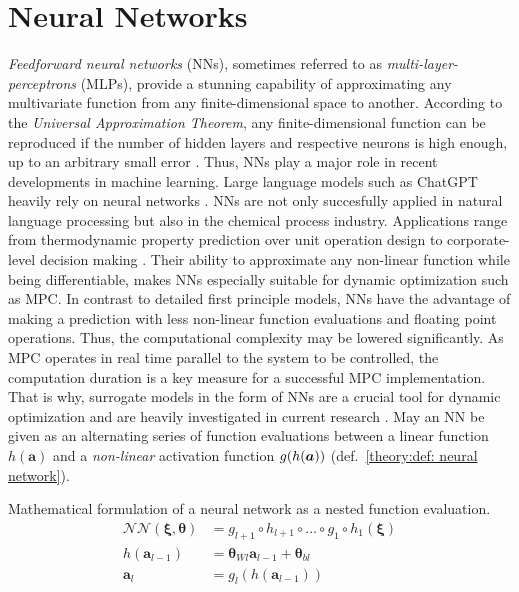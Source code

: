 \section{Neural Networks}
 
\emph{Feedforward neural networks} (NNs), sometimes referred to as \emph{multi-layer-perceptrons} (MLPs),
provide a stunning capability of approximating any multivariate function from any finite-dimensional
space to another. According to the \emph{Universal Approximation Theorem}, any finite-dimensional function can be reproduced if the number of hidden
layers and respective neurons is high enough, up to an arbitrary small error \cite{hornik1990}. Thus, NNs play a major role in
recent developments in machine learning. Large language models such as ChatGPT heavily rely on neural
networks \cite{vaswani2023}. NNs are not only succesfully applied in natural language processing but also in the chemical process industry.
Applications range from thermodynamic property prediction over unit operation design to corporate-level decision making \cite{mcbride2019}.
Their ability to approximate any non-linear function while being differentiable, makes NNs especially suitable for dynamic optimization
such as MPC. In contrast to detailed first principle models, NNs have the advantage of making a prediction with
less non-linear function evaluations and floating point operations. Thus, the computational complexity may be lowered significantly.
 As MPC operates in real time parallel to the system to be controlled, the computation duration is a key measure
for a successful MPC implementation. That is why, surrogate models in the form of NNs are a crucial tool for dynamic
optimization and are heavily investigated in current research \cite{salzmann2024l4casadi}. May an NN be given as an alternating series of function evaluations
between a linear function $h(\bm{a})$ and a \emph{non-linear} activation function $g(h({\bm{a}}))$ (def.~\ref{theory:def: neural network}).

\begin{definition} Mathematical formulation of a neural network as a nested function evaluation.
    \label{theory:def: neural network}
    \[
    \begin{aligned}
        \mathcal{NN}(\bm{\xi, \bm{\theta}}) &= g_{l+1} \circ h_{l+1} \circ ... \circ g_1 \circ h_1(\bm{\xi})
        \\
        h(\bm{a}_{l-1}) &= \bm{\theta}_{Wl}\bm{a}_{l-1} + \bm{\theta}_{bl}
        \\
        \bm{a}_{l} &= g_l(h(\bm{a}_{l-1}))
    \end{aligned}
    \]
\end{definition}

